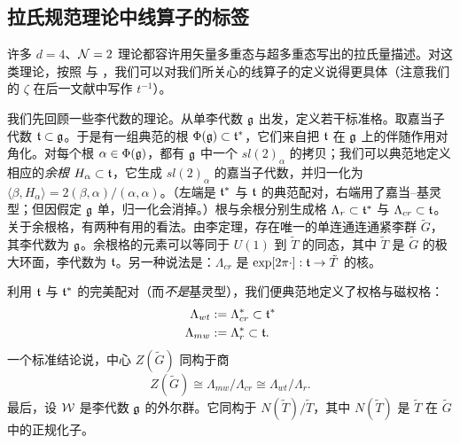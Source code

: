 \subsection{拉氏规范理论中线算子的标签}\label{subsec:LabelsForLines}

许多 $d=4$、$\mathcal{N}=2$ 理论都容许用矢量多重态与超多重态写出的拉氏量描述。对这类理论，按照 \cite{Kapustin:2005py} 与 \cite{Kapustin:2006hi}，我们可以对我们所关心的线算子的定义说得更具体（注意我们的 $\zeta$ 在后一文献中写作 $t^{-1}$）。

我们先回顾一些李代数的理论。从单李代数 $\mathfrak{g}$ 出发，定义若干标准格。取嘉当子代数 $\mathfrak{t}\subset\mathfrak{g}$。于是有一组典范的根 $\Phi(\mathfrak{g})\subset\mathfrak{t}^*$，它们来自把 $\mathfrak{t}$ 在 $\mathfrak{g}$ 上的伴随作用对角化。对每个根 $\alpha\in\Phi(\mathfrak{g})$，都有 $\mathfrak{g}$ 中一个 $sl(2)_\alpha$ 的拷贝；我们可以典范地定义相应的\emph{余根} $H_{\alpha}\subset\mathfrak{t}$，它生成 $sl(2)_\alpha$ 的嘉当子代数，并归一化为 $\langle \beta , H_{\alpha} \rangle = 2 (\beta,\alpha)/(\alpha,\alpha)$。（左端是 $\mathfrak{t}^*$ 与 $\mathfrak{t}$ 的典范配对，右端用了嘉当–基灵型；但因假定 $\mathfrak{g}$ 单，归一化会消掉。）根与余根分别生成格 $\Lambda_r\subset \mathfrak{t}^*$ 与 $\Lambda_{cr}\subset \mathfrak{t}$。关于余根格，有两种有用的看法。由李定理，存在唯一的单连通连通紧李群 $\tilde G$，其李代数为 $\mathfrak{g}$。余根格的元素可以等同于 $U(1)$ 到 $\tilde T$ 的同态，其中 $\tilde T$ 是 $\tilde G$ 的极大环面，李代数为 $\mathfrak{t}$。另一种说法是：$\Lambda_{cr}$ 是 $\exp[ 2\pi \cdot]: \mathfrak{t} \to \tilde T$ 的核。

利用 $\mathfrak{t}$ 与 $\mathfrak{t}^*$ 的完美配对（而\emph{不是}基灵型），我们便典范地定义了权格与磁权格：
\begin{equation}
\begin{split}
\Lambda_{wt} & := \Lambda_{cr}^* \subset \mathfrak{t}^* \\
\Lambda_{mw} & := \Lambda_{r}^* \subset \mathfrak{t}.
\end{split}
\end{equation}
一个标准结论说，中心 $Z(\tilde G)$ 同构于商
\begin{equation}
Z(\tilde G) \cong \Lambda_{mw}/\Lambda_{cr} \cong
\Lambda_{wt}/\Lambda_r.
\end{equation}
最后，设 $\mathcal{W}$ 是李代数 $\mathfrak{g}$ 的外尔群。它同构于 $N(\tilde T)/\tilde T$，其中 $N(\tilde T)$ 是 $\tilde T$ 在 $\tilde G$ 中的正规化子。

